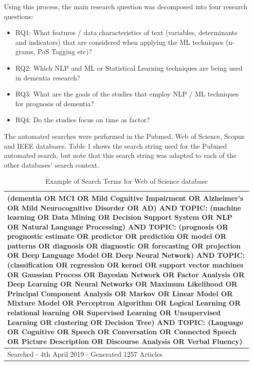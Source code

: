 Using this process, the main research question was decomposed  into four research questions:
\begin{itemize}
	\item RQ1: What features / data characteristics of text (variables, determinants and indicators) that are considered when applying the ML techniques (n-grams, PoS Tagging etc)?
	\item RQ2: Which NLP and ML or Statistical Learning techniques are being used in dementia research?
	\item RQ3: What are the goals of the studies that employ NLP / ML techniques for prognosis of dementia?
	\item RQ4: Do the studies focus on time as factor?
\end{itemize}
\par 
The automated searches were performed in the Pubmed, Web of Science, Scopus and IEEE databases. Table 1 shows the search string used for the Pubmed automated search, but note that this search string was adapted to each of the other databases’ search context.

\begin{table}[H]
	\begin{center}
	\begin{tabular}{ | p{12cm} | }
	\hline
	(dementia OR MCI OR Mild Cognitive Impairment OR Alzheimer's OR Mild Neurocognitive Disorder OR AD) AND TOPIC: (machine learning OR Data Mining OR Decision Support System OR NLP OR Natural 			Language Processing) AND TOPIC: (prognosis OR prognostic estimate OR predictor OR prediction OR model OR patterns OR diagnosis OR diagnostic OR forecasting OR projection OR Deep Language Model 		OR Deep Neural Network) AND TOPIC: (classification OR regression OR kernel OR support vector machines OR Gaussian Process OR Bayesian Network OR Factor Analysis OR Deep Learning OR Neural 			Networks OR Maximum Likelihood OR Principal Component Analysis OR Markov OR Linear Model OR Mixture Model OR Perceptron Algorithm OR Logical Learning OR relational learning OR Supervised 				Learning OR Unsupervised Learning OR clustering OR Decision Tree) AND TOPIC: (Language OR Cognitive OR Speech OR Conversation OR Connected Speech OR Picture Description OR Discourse Analysis OR 		Verbal Fluency)  \\ \hline
	Searched - 4th April 2019 - Generated 1257 Articles \\
	\hline
	\end{tabular}
	\end{center}
	\caption[Table caption text]{Example of Search Terms for Web of Science database}
	\label{table:name}
\end{table}

